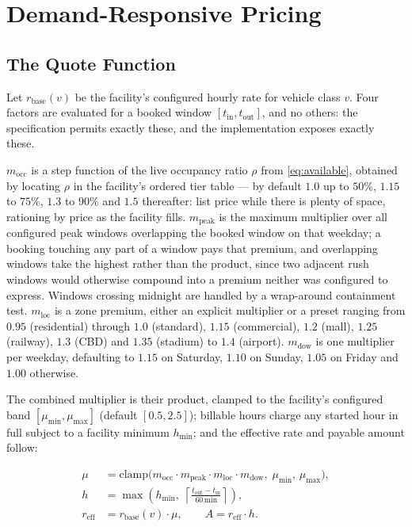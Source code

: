 \documentclass[journal,onecolumn,11pt]{IEEEtran}
\begin{document}
\section{Demand-Responsive Pricing}
\label{sec:pricing}

\subsection{The Quote Function}

Let $r_{\text{base}}(v)$ be the facility's configured hourly rate for vehicle
class $v$. Four factors are evaluated for a booked window
$[t_{\text{in}}, t_{\text{out}}]$, and no others: the specification permits
exactly these, and the implementation exposes exactly these.

$m_{\text{occ}}$ is a step function of the live occupancy ratio $\rho$ from
\eqref{eq:available}, obtained by locating $\rho$ in the facility's ordered
tier table --- by default $1.0$ up to $50\%$, $1.15$ to $75\%$, $1.3$ to $90\%$
and $1.5$ thereafter: list price while there is plenty of space, rationing by
price as the facility fills. $m_{\text{peak}}$ is the maximum multiplier over
all configured peak windows overlapping the booked window on that weekday; a
booking touching any part of a window pays that premium, and overlapping
windows take the highest rather than the product, since two adjacent rush
windows would otherwise compound into a premium neither was configured to
express. Windows crossing midnight are handled by a wrap-around containment
test. $m_{\text{loc}}$ is a zone premium, either an explicit multiplier or a
preset ranging from $0.95$ (residential) through $1.0$ (standard), $1.15$
(commercial), $1.2$ (mall), $1.25$ (railway), $1.3$ (CBD) and $1.35$ (stadium)
to $1.4$ (airport). $m_{\text{dow}}$ is one multiplier per weekday, defaulting
to $1.15$ on Saturday, $1.10$ on Sunday, $1.05$ on Friday and $1.00$ otherwise.

The combined multiplier is their product, clamped to the facility's configured
band $[\mu_{\min}, \mu_{\max}]$ (default $[0.5, 2.5]$); billable hours charge
any started hour in full subject to a facility minimum $h_{\min}$; and the
effective rate and payable amount follow:

\begin{align}
  \mu &= \mathrm{clamp}\bigl(
    m_{\text{occ}} \cdot m_{\text{peak}} \cdot m_{\text{loc}} \cdot
    m_{\text{dow}},\; \mu_{\min},\, \mu_{\max}\bigr),
  \label{eq:mu}\\
  h &= \max\!\left(h_{\min},\;
    \left\lceil \frac{t_{\text{out}} - t_{\text{in}}}{60\,\text{min}}
    \right\rceil\right),
  \label{eq:hours}\\
  r_{\text{eff}} &= r_{\text{base}}(v)\cdot\mu,
  \qquad
  A = r_{\text{eff}} \cdot h .
  \label{eq:amount}
\end{align}
\end{document}
